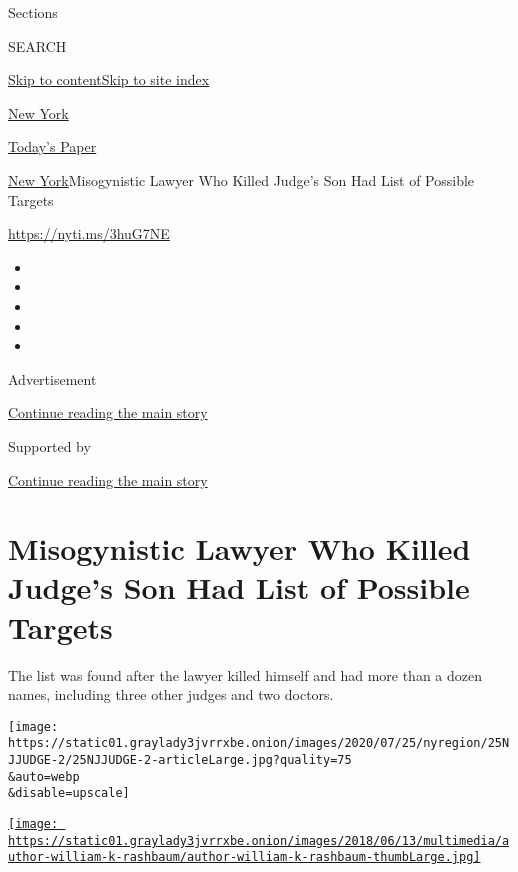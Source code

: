 Sections

SEARCH

\protect\hyperlink{site-content}{Skip to
content}\protect\hyperlink{site-index}{Skip to site index}

\href{https://www.nytimes3xbfgragh.onion/section/nyregion}{New York}

\href{https://myaccount.nytimes3xbfgragh.onion/auth/login?response_type=cookie\&client_id=vi}{}

\href{https://www.nytimes3xbfgragh.onion/section/todayspaper}{Today's
Paper}

\href{/section/nyregion}{New York}\textbar{}Misogynistic Lawyer Who
Killed Judge's Son Had List of Possible Targets

\url{https://nyti.ms/3huG7NE}

\begin{itemize}
\item
\item
\item
\item
\item
\end{itemize}

Advertisement

\protect\hyperlink{after-top}{Continue reading the main story}

Supported by

\protect\hyperlink{after-sponsor}{Continue reading the main story}

\hypertarget{misogynistic-lawyer-who-killed-judges-son-had-list-of-possible-targets}{%
\section{Misogynistic Lawyer Who Killed Judge's Son Had List of Possible
Targets}\label{misogynistic-lawyer-who-killed-judges-son-had-list-of-possible-targets}}

The list was found after the lawyer killed himself and had more than a
dozen names, including three other judges and two doctors.

\texttt{[image: https://static01.graylady3jvrrxbe.onion/images/2020/07/25/nyregion/25NJJUDGE-2/25NJJUDGE-2-articleLarge.jpg?quality=75\\\&auto=webp\\\&disable=upscale]}

\href{https://www.nytimes3xbfgragh.onion/by/william-k-rashbaum}{\texttt{[image: https://static01.graylady3jvrrxbe.onion/images/2018/06/13/multimedia/author-william-k-rashbaum/author-william-k-rashbaum-thumbLarge.jpg]}}

